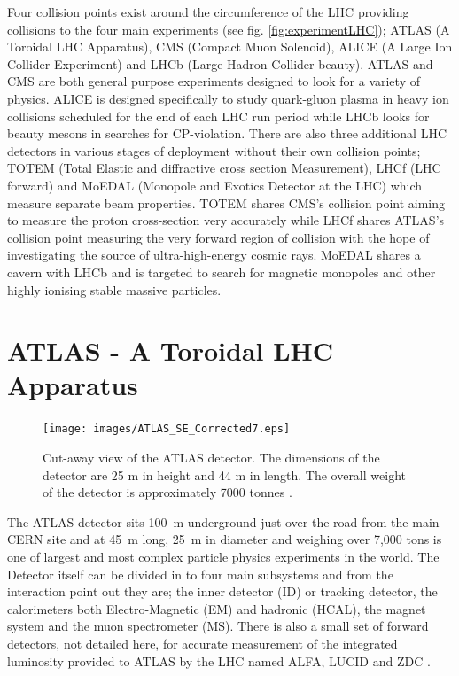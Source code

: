 	Four collision points exist around the circumference of the LHC providing collisions to the four main experiments (see fig. \ref{fig:experimentLHC}); ATLAS (A Toroidal LHC Apparatus), CMS (Compact Muon Solenoid), ALICE (A Large Ion Collider Experiment) and LHCb (Large Hadron Collider beauty). ATLAS and CMS are both general purpose experiments designed to look for a variety of physics. ALICE is designed specifically to study quark-gluon plasma in heavy ion collisions scheduled for the end of each LHC run period while LHCb looks for beauty mesons in searches for CP-violation.
	There are also three additional LHC detectors in various stages of deployment without their own collision points; TOTEM (Total Elastic and diffractive cross section Measurement), LHCf (LHC forward) and MoEDAL (Monopole and Exotics Detector at the LHC) which measure separate beam properties. TOTEM shares CMS's collision point aiming to measure the proton cross-section very accurately while LHCf shares ATLAS's collision point measuring the very forward region of collision with the hope of investigating the source of ultra-high-energy cosmic rays. MoEDAL shares a cavern with LHCb and is targeted to search for magnetic monopoles and other highly ionising stable massive particles.



\section{ATLAS - A Toroidal LHC Apparatus}

	\begin{figure}[h]
		\begin{center}
			\texttt{[image: images/ATLAS\_SE\_Corrected7.eps]}
		\end{center}
		\caption{Cut-away view of the ATLAS detector. The dimensions of the detector are 25 m in height and 44 m in length. The overall weight of the detector is approximately 7000 tonnes \cite{Aad:1129811}.}
		\label{fig:ATLAS_cutaway}
	\end{figure}


	The ATLAS detector \cite{Aad:1129811} sits \SI{100}{\m} underground just over the road from the main CERN site and at \SI{45}{\m} long, \SI{25}{\m} in diameter and weighing over 7,000 tons is one of largest and most complex particle physics experiments in the world. The Detector itself can be divided in to four main subsystems and from the interaction point out they are; the inner detector (ID) or tracking detector, the calorimeters both Electro-Magnetic (EM) and hadronic (HCAL), the magnet system and the muon spectrometer (MS). There is also a small set of forward detectors, not detailed here, for accurate measurement of the integrated luminosity provided to ATLAS by the LHC named ALFA, LUCID and ZDC \cite{Aad:1129811}. 

